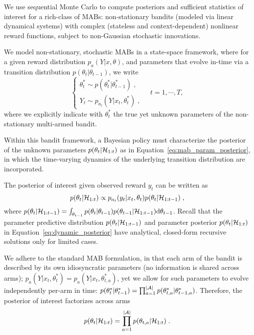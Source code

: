 We use sequential Monte Carlo to compute posteriors and sufficient statistics of interest for a rich-class of MABs:
non-stationary bandits (modeled via linear dynamical systems)
with complex (stateless and context-dependent) nonlinear reward functions,
subject to non-Gaussian stochastic innovations.

We model non-stationary, stochastic MABs in a state-space framework,
where for a given reward distribution $p_{a}(Y|x,\theta)$,
and parameters that evolve in-time via a transition distribution $p(\theta_{t}|\theta_{t-1})$,
we write
\begin{equation}
\begin{cases}
\theta_{t}^* \sim p(\theta_{t}^*|\theta_{t-1}^*) \; ,\\
Y_{t}\sim p_{a_t}(Y|x_t,\theta_{t}^*) \; ,
\end{cases}
\quad t=1, \cdots, T,
\label{eq:dynamic_mab}
\end{equation}
where we explicitly indicate with $\theta_t^*$ the true yet unknown parameters of the non-stationary multi-armed bandit.

Within this bandit framework, a Bayesian policy must characterize
the posterior of the unknown parameters $p(\theta_t|\mathcal{H}_{1:t})$ as in Equation~\eqref{eq:mab_param_posterior},
in which the time-varying dynamics of the underlying transition distribution are incorporated.

The posterior of interest given observed reward $y_t$
can be written as
\begin{equation}
p(\theta_{t}|\mathcal{H}_{1:t}) \propto p_{a_t}(y_t|x_t, \theta_{t}) p(\theta_{t} |\mathcal{H}_{1:t-1}) \; ,
\label{eq:dynamic_posterior}
\end{equation}
where $p(\theta_t| \mathcal{H}_{1:t-1}) = \int_{\theta_{t-1}} p(\theta_{t} | \theta_{t-1}) p(\theta_{t-1}|\mathcal{H}_{1:t-1}) \mathrm{d} \theta_{t-1}$.
%
Recall that the parameter predictive distribution $p(\theta_t| \mathcal{H}_{1:t-1})$ and parameter posterior $p(\theta_{t}|\mathcal{H}_{1:t})$ in Equation~\eqref{eq:dynamic_posterior} 
have analytical, closed-form recursive solutions only for limited cases.

We adhere to the standard MAB formulation,
in that each arm of the bandit is described by its own idiosyncratic parameters
(no information is shared across arms);
\ie $p_{a}(Y| x_t,\theta_{t}^*)=p_{a}(Y|x_t,\theta_{t,a}^*)$,
yet we allow for such parameters to evolve independently per-arm in time:
$p(\theta_{t}^*|\theta_{t-1}^*)=\prod_{a=1}^{|\mathcal{A}|} p(\theta_{t,a}^*|\theta_{t-1,a}^*)$.
Therefore, the posterior of interest factorizes across arms
\begin{equation}
	p(\theta_{t}|\mathcal{H}_{1:t}) = \prod_{a=1}^{|\mathcal{A}|} p(\theta_{t,a}|\mathcal{H}_{1:t})\; .
	\label{eq:dynamic_posterior_factorized}
\end{equation}

